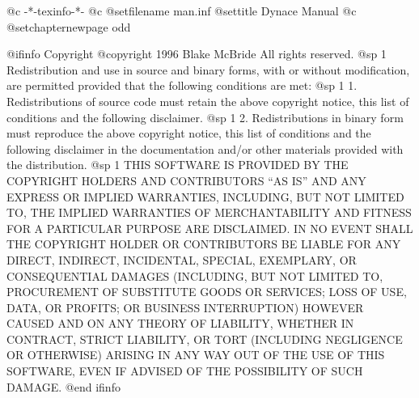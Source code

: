     @c -*-texinfo-*-
@c %
@setfilename man.inf
@settitle Dynace Manual
@c %
@setchapternewpage odd

@ifinfo
Copyright  @copyright{} 1996 Blake McBride
All rights reserved.
@sp 1
Redistribution and use in source and binary forms, with or without
modification, are permitted provided that the following conditions are
met:
@sp 1
1. Redistributions of source code must retain the above copyright
notice, this list of conditions and the following disclaimer.
@sp 1
2. Redistributions in binary form must reproduce the above copyright
notice, this list of conditions and the following disclaimer in the
documentation and/or other materials provided with the distribution.
@sp 1
THIS SOFTWARE IS PROVIDED BY THE COPYRIGHT HOLDERS AND CONTRIBUTORS
``AS IS'' AND ANY EXPRESS OR IMPLIED WARRANTIES, INCLUDING, BUT NOT
LIMITED TO, THE IMPLIED WARRANTIES OF MERCHANTABILITY AND FITNESS FOR
A PARTICULAR PURPOSE ARE DISCLAIMED. IN NO EVENT SHALL THE COPYRIGHT
HOLDER OR CONTRIBUTORS BE LIABLE FOR ANY DIRECT, INDIRECT, INCIDENTAL,
SPECIAL, EXEMPLARY, OR CONSEQUENTIAL DAMAGES (INCLUDING, BUT NOT
LIMITED TO, PROCUREMENT OF SUBSTITUTE GOODS OR SERVICES; LOSS OF USE,
DATA, OR PROFITS; OR BUSINESS INTERRUPTION) HOWEVER CAUSED AND ON ANY
THEORY OF LIABILITY, WHETHER IN CONTRACT, STRICT LIABILITY, OR TORT
(INCLUDING NEGLIGENCE OR OTHERWISE) ARISING IN ANY WAY OUT OF THE USE
OF THIS SOFTWARE, EVEN IF ADVISED OF THE POSSIBILITY OF SUCH DAMAGE.
@end ifinfo

